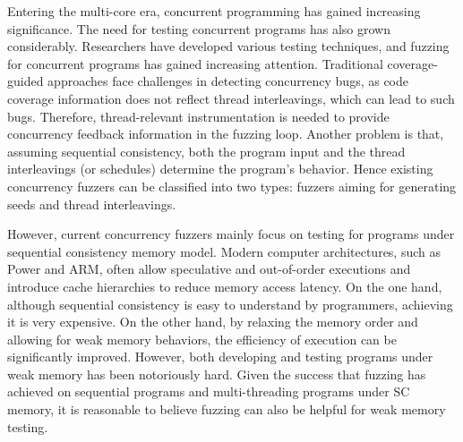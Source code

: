 



Entering the multi-core era, concurrent programming has gained increasing significance. The need for testing concurrent programs has also grown considerably. Researchers have developed various testing techniques, and fuzzing for concurrent programs has gained increasing attention. Traditional coverage-guided approaches face challenges in detecting concurrency bugs, as code coverage information does not reflect thread interleavings, which can lead to such bugs. Therefore, thread-relevant instrumentation is needed to provide concurrency feedback information in the fuzzing loop. Another problem is that, assuming sequential consistency, both the program input and the thread interleavings (or schedules) determine the program's behavior. Hence existing concurrency fuzzers can be classified into two types: fuzzers aiming for generating seeds\cite{muzz} and thread interleavings\cite{rff, conzzer}.

However, current concurrency fuzzers mainly focus on testing for programs under sequential consistency memory model. Modern computer architectures, such as Power\cite{Power} and ARM\cite{arm, ARMv8}, often allow speculative and out-of-order executions and introduce cache hierarchies to reduce memory access latency. On the one hand, although sequential consistency is easy to understand by programmers, achieving it is very expensive. On the other hand, by relaxing the memory order and allowing for weak memory behaviors, the efficiency of execution can be significantly improved. However, both developing and testing programs under weak memory has been notoriously hard. Given the success that fuzzing has achieved on sequential programs and multi-threading programs under SC memory, it is reasonable to believe fuzzing can also be helpful for weak memory testing. 


